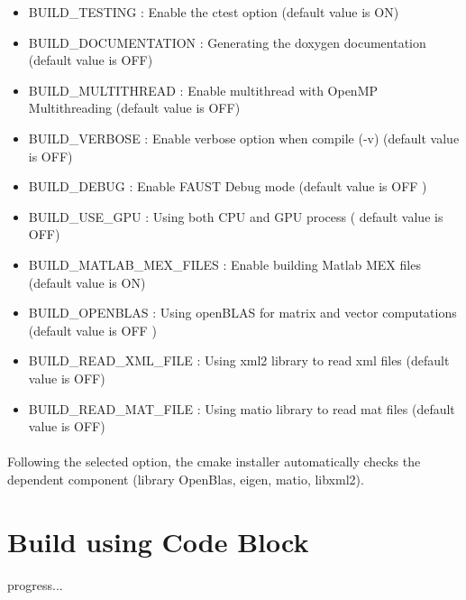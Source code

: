 \begin{itemize}
\item BUILD\_TESTING : Enable the ctest option (default value is ON)
\item BUILD\_DOCUMENTATION : Generating the doxygen documentation (default value is OFF)  
\item BUILD\_MULTITHREAD : Enable multithread with OpenMP Multithreading (default value is OFF)
\item BUILD\_VERBOSE : Enable verbose option when compile (-v) (default value is OFF)
\item BUILD\_DEBUG : Enable FAUST Debug mode (default value is OFF )
\item BUILD\_USE\_GPU : Using both CPU and GPU process ( default value is OFF)
\item BUILD\_MATLAB\_MEX\_FILES : Enable building Matlab MEX files (default value is ON)
\item BUILD\_OPENBLAS : Using openBLAS for matrix and vector computations (default value is OFF )
\item BUILD\_READ\_XML\_FILE : Using xml2 library to read xml files (default value is OFF)
\item BUILD\_READ\_MAT\_FILE : Using matio library to read mat files (default value is OFF)
\end{itemize}

\paragraph{}Following the selected option, the cmake installer automatically checks the dependent component (library OpenBlas, eigen, matio, libxml2).  

\section{Build using Code Block}\label{sec:UnixInstallCodeBlock}
progress...
